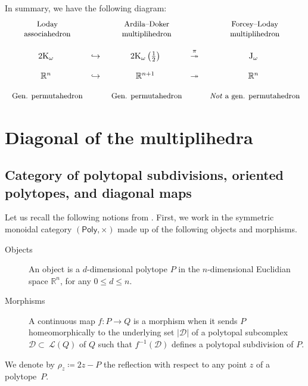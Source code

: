 \documentclass[twoside, 12pt]{amsart}
\theoremstyle{remark}
\newcommand{\RR}{\mathbb{R}}
\newcommand{\K}{\mathrm{K}}
\newcommand{\J}{\mathrm{J}}
\newcommand{\La}{\mathcal{L}}
\newcommand{\PolySub}{\mathsf{Poly}}
\begin{document}
In summary, we have the following diagram:
\begin{equation*}
\begin{matrix}
  $ \small  \text{Loday}$ & & $ \small \text{Ardila--Doker}$ &  & $ \small \text{Forcey--Loday}$ \\
  $ \small  \text{associahedron}$ & & $ \small \text{multiplihedron}$ &  & $ \small \text{multiplihedron}$ \\
  & &  &  & \\
  2\K_\omega & \hookrightarrow & 2\K_\omega \left(\tfrac{1}{2}\right) & \overset{\pi}{\twoheadrightarrow} & \J_\omega \\
   & &  &  & \\
  \RR^n & \hookrightarrow & \RR^{n+1} & \twoheadrightarrow & \RR^n \\
  & &  &  & \\
  $ \small \text{Gen. permutahedron}$ & & $ \small \text{Gen. permutahedron}$ &  & $ \small \textit{Not}\text{ a gen. permutahedron}$
\end{matrix}
\end{equation*}


\section{Diagonal of the multiplihedra}
 
\subsection{Category of polytopal subdivisions, oriented polytopes, and diagonal maps}
Let us recall the following notions from \cite[Section~2.1]{MTTV19}. 
First, we work in the symmetric monoidal category $(\PolySub, \times)$ made up of the following objects and morphisms.
\begin{description}
\item[{\sc Objects}] An object is a $d$-dimensional  polytope $P$ in the $n$-dimensional Euclidian space $\RR^n$, for any $0\leq d\leq n$.
\item[{\sc Morphisms}] A continuous map  $f: P\to Q$ is a morphism when 
it sends  $P$ homeomorphically to the underlying set $|\mathcal{D}|$ of a polytopal subcomplex $\mathcal{D}\subset~\La(Q)$ of $Q$ 
such that $f^{-1}(\mathcal D)$ defines a polytopal subdivision of $P$.
\end{description}

We denote by $\rho_z\coloneqq 2z-P$ the reflection with respect to any point $z$ of a polytope~$P$. 
\end{document}
